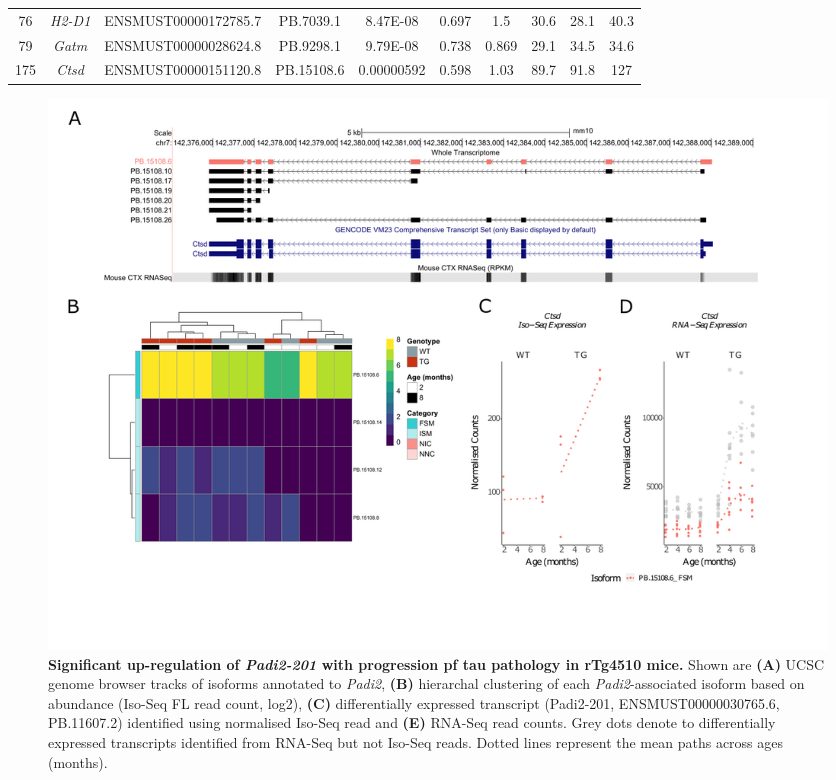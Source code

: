 \begin{landscape}
\begin{table}[]
\begin{tabular}{@{}cccccccccc@{}}
		76  & \textit{H2-D1}  & ENSMUST00000172785.7  & PB.7039.1  & 8.47E-08   & 0.697 & 1.5   & 30.6  & 28.1  & 40.3  \\
		79  & \textit{Gatm}   & ENSMUST00000028624.8  & PB.9298.1  & 9.79E-08   & 0.738 & 0.869 & 29.1  & 34.5  & 34.6  \\
		175 & \textit{Ctsd}   & ENSMUST00000151120.8  & PB.15108.6 & 0.00000592 & 0.598 & 1.03  & 89.7  & 91.8  & 127   \\ \bottomrule
	\end{tabular}
	\label{tab:DEI_trans}
\end{table}
\end{landscape}

\begin{landscape}
	\begin{figure}[!htp]
		\centering
		\includegraphics[page=4,trim={1.5cm 3.5cm 2cm 1cm}, scale = 0.85]{Figures/Ch5_DiffPlots_Landscape.pdf}
		\captionsetup{width=1.5\textwidth}
		\caption[Differential \textit{Padi2} transcript expression]%
		{\textbf{Significant up-regulation of \textit{Padi2-201} with progression pf tau pathology in rTg4510 mice.} Shown are \textbf{(A)} UCSC genome browser tracks of isoforms annotated to \textit{Padi2}, \textbf{(B)} hierarchal clustering of each \textit{Padi2}-associated isoform based on abundance (Iso-Seq FL read count, log2), \textbf{(C)} differentially expressed transcript (Padi2-201, ENSMUST00000030765.6, PB.11607.2) identified using normalised Iso-Seq read and \textbf{(E)} RNA-Seq read counts. Grey dots denote to differentially expressed transcripts identified from RNA-Seq but not Iso-Seq reads. Dotted lines represent the mean paths across ages (months).}   
		\label{fig:Padi2}
	\end{figure}	
\end{landscape}

